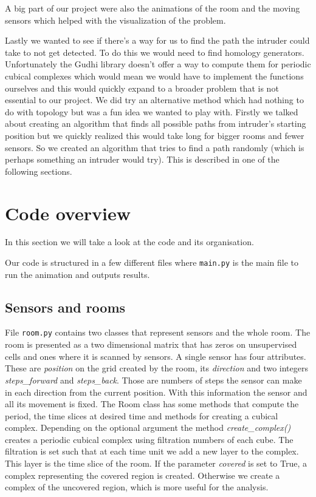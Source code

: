 \documentclass{article}
\begin{document}
A big part of our project were also the animations of the room and the moving sensors which helped with the visualization of the problem. 

Lastly we wanted to see if there's a way for us to find the path the intruder could take to not get detected. To do this we would need to find homology generators. Unfortunately the Gudhi library doesn't offer a way to compute them for periodic cubical complexes which would mean we would have to implement the functions ourselves and this would quickly expand to a broader problem that is not essential to our project.  We did try an alternative method which had nothing to do with topology but was a fun idea we wanted to play with. Firstly we talked about creating an algorithm that finds all possible paths from intruder's starting position but we quickly realized this would take long for bigger rooms and fewer sensors. So we created an algorithm that tries to find a path randomly (which is perhaps something an intruder would try). This is described in one of the following sections.

\section{Code overview}
In this section we will take a look at the code and its organisation. 


Our code is structured in a few different files where \texttt{main.py} is the main file to run the animation and outputs results. 

\subsection*{Sensors and rooms}

File \texttt{room.py} contains two classes that represent sensors and the whole room. The room is presented as a two dimensional matrix that has zeros on unsupervised cells and ones where it is scanned by sensors. A single sensor has four attributes. These are \textit{position} on the grid created by the room, its \textit{direction} and two integers \textit{steps\_forward} and \textit{steps\_back}. Those are numbers of steps the sensor can make in each direction from the current position. With this information the sensor and all its movement is fixed. The Room class has some methods that compute the period, the time slices at desired time and methods for creating a cubical complex. Depending on the optional argument the method \textit{create\_complex()} creates a periodic cubical complex using filtration numbers of each cube. The filtration is set such that at each time unit we add a new layer to the complex. This layer is the time slice of the room. If the parameter \textit{covered} is set to True, a complex representing the covered region is created. Otherwise we create a complex of the uncovered region, which is more useful for the analysis. 
\end{document}
